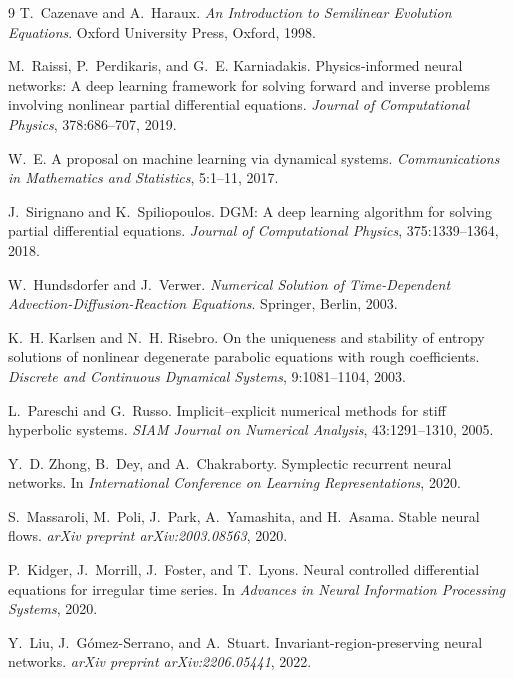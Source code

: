 \documentclass[hidelinks,review,nohypdvips,onefignum,onetabnum]{siamart220329}
\newcounter{problem}[section]
\begin{document}
\begin{thebibliography}{9}
T.~Cazenave and A.~Haraux.
\emph{An Introduction to Semilinear Evolution Equations}.
Oxford University Press, Oxford, 1998.

M.~Raissi, P.~Perdikaris, and G.~E. Karniadakis.
Physics-informed neural networks: A deep learning framework for solving forward and inverse problems involving nonlinear partial differential equations.
\emph{Journal of Computational Physics}, 378:686--707, 2019.

W.~E.
A proposal on machine learning via dynamical systems.
\emph{Communications in Mathematics and Statistics}, 5:1--11, 2017.

J.~Sirignano and K.~Spiliopoulos.
DGM: A deep learning algorithm for solving partial differential equations.
\emph{Journal of Computational Physics}, 375:1339--1364, 2018.

W.~Hundsdorfer and J.~Verwer.
\emph{Numerical Solution of Time-Dependent Advection-Diffusion-Reaction Equations}.
Springer, Berlin, 2003.

K.~H. Karlsen and N.~H. Risebro.
On the uniqueness and stability of entropy solutions of nonlinear degenerate parabolic equations with rough coefficients.
\emph{Discrete and Continuous Dynamical Systems}, 9:1081--1104, 2003.

L.~Pareschi and G.~Russo.
Implicit--explicit numerical methods for stiff hyperbolic systems.
\emph{SIAM Journal on Numerical Analysis}, 43:1291--1310, 2005.

Y.~D. Zhong, B.~Dey, and A.~Chakraborty.
Symplectic recurrent neural networks.
In \emph{International Conference on Learning Representations}, 2020.

S.~Massaroli, M.~Poli, J.~Park, A.~Yamashita, and H.~Asama.
Stable neural flows.
\emph{arXiv preprint arXiv:2003.08563}, 2020.

P.~Kidger, J.~Morrill, J.~Foster, and T.~Lyons.
Neural controlled differential equations for irregular time series.
In \emph{Advances in Neural Information Processing Systems}, 2020.

Y.~Liu, J.~G{\'o}mez-Serrano, and A.~Stuart.
Invariant-region-preserving neural networks.
\emph{arXiv preprint arXiv:2206.05441}, 2022.


\end{thebibliography}
\end{document}
